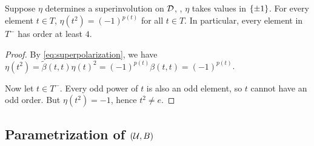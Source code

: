 
\begin{cor}\label{cor:eta-t-square}
    Suppose $\eta$ determines a superinvolution on $\mathcal{D}$, \ie, $\eta$ takes values in $\{ \pm 1 \}$. 
    For every element $t\in T$, $\eta(t^2) = (-1)^{p(t)}$ for all $t\in T$. 
    In particular, every element in $T^-$ has order at least $4$. 
\end{cor}

\begin{proof}
    By \cref{eq:superpolarization}, we have $\eta (t^2) = \tilde\beta(t,t) \eta(t)^2 = (-1)^{p(t)} \beta(t,t) = (-1)^{p(t)}$. 
    
    Now let $t\in T^-$.
	Every odd power of $t$ is also an odd element, so $t$ cannot have an odd order.
	But $\eta (t^2) = -1$, hence $t^2 \neq e$. 
\end{proof}




\subsection{Parametrization of \texorpdfstring{$(\mathcal U, B)$}{(U, B)}}\label{ssec:parameters-(U-B)}


